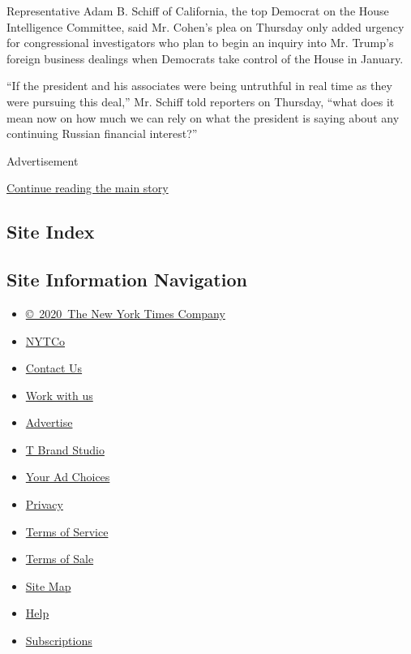 Representative Adam B. Schiff of California, the top Democrat on the
House Intelligence Committee, said Mr. Cohen's plea on Thursday only
added urgency for congressional investigators who plan to begin an
inquiry into Mr. Trump's foreign business dealings when Democrats take
control of the House in January.

``If the president and his associates were being untruthful in real time
as they were pursuing this deal,'' Mr. Schiff told reporters on
Thursday, ``what does it mean now on how much we can rely on what the
president is saying about any continuing Russian financial interest?''

Advertisement

\protect\hyperlink{after-bottom}{Continue reading the main story}

\hypertarget{site-index}{%
\subsection{Site Index}\label{site-index}}

\hypertarget{site-information-navigation}{%
\subsection{Site Information
Navigation}\label{site-information-navigation}}

\begin{itemize}
\tightlist
\item
  \href{https://help.nytimes.com/hc/en-us/articles/115014792127-Copyright-notice}{©~2020~The
  New York Times Company}
\end{itemize}

\begin{itemize}
\tightlist
\item
  \href{https://www.nytco.com/}{NYTCo}
\item
  \href{https://help.nytimes.com/hc/en-us/articles/115015385887-Contact-Us}{Contact
  Us}
\item
  \href{https://www.nytco.com/careers/}{Work with us}
\item
  \href{https://nytmediakit.com/}{Advertise}
\item
  \href{http://www.tbrandstudio.com/}{T Brand Studio}
\item
  \href{https://www.nytimes.com/privacy/cookie-policy\#how-do-i-manage-trackers}{Your
  Ad Choices}
\item
  \href{https://www.nytimes.com/privacy}{Privacy}
\item
  \href{https://help.nytimes.com/hc/en-us/articles/115014893428-Terms-of-service}{Terms
  of Service}
\item
  \href{https://help.nytimes.com/hc/en-us/articles/115014893968-Terms-of-sale}{Terms
  of Sale}
\item
  \href{https://spiderbites.nytimes.com}{Site Map}
\item
  \href{https://help.nytimes.com/hc/en-us}{Help}
\item
  \href{https://www.nytimes.com/subscription?campaignId=37WXW}{Subscriptions}
\end{itemize}

